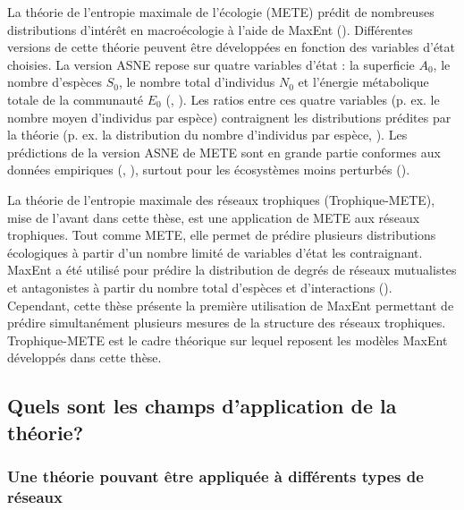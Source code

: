 La théorie de l'entropie maximale de l'écologie (METE) prédit de nombreuses
distributions d'intérêt en macroécologie à l'aide de MaxEnt
(\cite{Harte2011Maximum}). Différentes versions de cette théorie peuvent être
développées en fonction des variables d'état choisies. La version ASNE repose
sur quatre variables d'état : la superficie $A_0$, le nombre d'espèces $S_0$, le
nombre total d'individus $N_0$ et l'énergie métabolique totale de la communauté
$E_0$ (\cite{Harte2008Maximum}, \cite{Harte2014Maximum}). Les ratios entre ces
quatre variables (p. ex. le nombre moyen d'individus par espèce) contraignent
les distributions prédites par la théorie (p. ex. la distribution du nombre
d'individus par espèce, \cite{Brummer2019Derivations}). Les prédictions de la
version ASNE de METE sont en grande partie conformes aux données empiriques
(\cite{Harte2011Maximum}, \cite{McGlinn2015Exploring}), surtout pour les
écosystèmes moins perturbés (\cite{Newman2020Disturbance}). 

La théorie de l'entropie maximale des réseaux trophiques (Trophique-METE), mise
de l'avant dans cette thèse, est une application de METE aux réseaux trophiques.
Tout comme METE, elle permet de prédire plusieurs distributions écologiques à
partir d'un nombre limité de variables d'état les contraignant. MaxEnt a été
utilisé pour prédire la distribution de degrés de réseaux mutualistes et
antagonistes à partir du nombre total d'espèces et d'interactions
(\cite{Williams2011Biology}). Cependant, cette thèse présente la première
utilisation de MaxEnt permettant de prédire simultanément plusieurs mesures de
la structure des réseaux trophiques. Trophique-METE est le cadre théorique sur
lequel reposent les modèles MaxEnt développés dans cette thèse.

\subsection{Quels sont les champs d'application de la théorie?} 

\subsubsection{Une théorie pouvant être appliquée à différents types de réseaux} 

